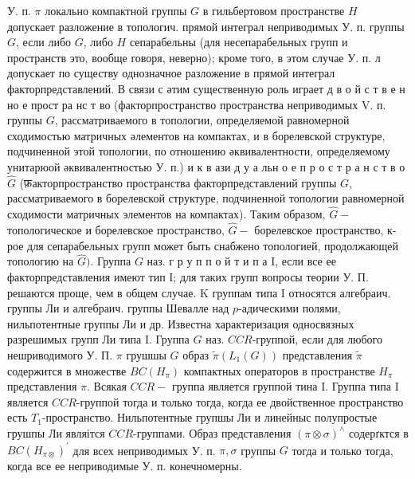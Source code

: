 \documentclass[10pt]{article}
\begin{document}
У. п. $\pi$ локально компактной группы $G$ в гильбертовом пространстве $H$ допускает разложение в топологич. прямой интеграл неприводимых У. п. группы $G$, если либо $G$, либо $H$ сепарабельны (для несепарабельных групп и пространств это, вообще говоря, неверно); кроме того, в этом случае У. п. л допускает по существу однозначное разложение в прямой интеграл факторпредставлений. В связи с әтим существенную роль играет д в о й с т в е н но е прост ра нс т во (факторпространство пространства неприводимых $\mathrm{V}$. п. группы $G$, рассматриваемого в топологии, определяемой равномерной сходимостью матричных әлементов на компактах, и в борелевской структуре, подчиненной этой топологии, по отношению әквивалентности, определяемому унитарюой әквивалентностью У. п.) и к в ази д у а льн о е п р о с т р а н с т в о $\hat{G}$ (फ़акторпространство пространства факторпредставлений группы $G$, рассматриваемого в борелевской структуре, подчиненной топологии равномерной сходимости матричных элементов на компактах). Таким образом, $\hat{G}-$ топологическое и борелевское пространство, $\hat{G}-$ борелевское пространство, к-рое для сепарабельных групп может быть снабжено топологией, продолжающей топологию на $\widehat{G})$. Группа $G$ наз. г р у п п о й т и п а I, если все ее факторпредставления имеют тип I; для таких групп вопросы теории У. П. решаются проще, чем в общем случае. $\mathrm{K}$ группам типа I относятся алгебраич. группы Ли и алгебраич. группы Шевалле над $p$-адическими полями, нильпотентные группы Ли и др. Известна характеризация односвязных разрешимых групп Ли типа I. Группа $G$ наз. $C C R$-группой, если для любого нешриводимого У. П. $\pi$ грушшы $G$ образ $\tilde{\pi}\left(L_{1}(G)\right)$ представления $\tilde{\pi}$ содержится в множестве $B C\left(H_{\pi}\right)$ компактных операторов в пространстве $H_{\pi}$ представления $\pi$. Всякая $C C R-$ группа является группой тина I. Группа типа I является $C C R$-группой тогда и только тогда, когда ее двойственное пространство есть $T_{1}$-пространство. Нильпотентные групшы Ли и линейныс полупростые грушпы Ли являітся $C C R$-группами. Образ представления $(\pi \otimes \sigma)^{\wedge}$ содерґктся в $B C\left(H_{\pi \otimes}\right)^{\prime}$ для всех неприводимых У. п. $\pi, \sigma$ группы $G$ тогда и только тогда, когда все ее неприводимые У. п. конечномерны.
\end{document}
